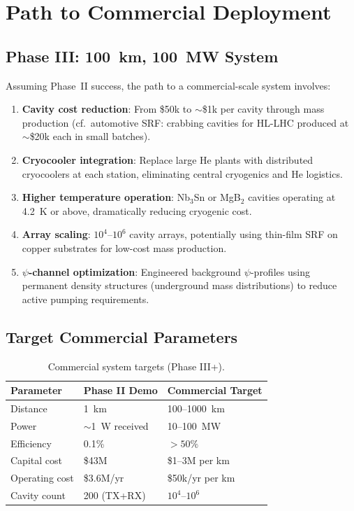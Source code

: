 \documentclass[11pt,letterpaper]{article}
\begin{document}
\section{Path to Commercial Deployment}

\subsection{Phase III: 100~km, 100~MW System}

Assuming Phase~II success, the path to a commercial-scale system involves:

\begin{enumerate}
\item \textbf{Cavity cost reduction}: From \$50k to $\sim$\$1k per
cavity through mass production (cf.\ automotive SRF: crabbing cavities
for HL-LHC produced at $\sim$\$20k each in small batches).

\item \textbf{Cryocooler integration}: Replace large He plants with
distributed cryocoolers at each station, eliminating central cryogenics
and He logistics.

\item \textbf{Higher temperature operation}: Nb$_3$Sn or MgB$_2$
cavities operating at 4.2~K or above, dramatically reducing cryogenic
cost.

\item \textbf{Array scaling}: $10^4$--$10^6$ cavity arrays, potentially
using thin-film SRF on copper substrates for low-cost mass production.

\item \textbf{$\psi$-channel optimization}: Engineered background
$\psi$-profiles using permanent density structures (underground mass
distributions) to reduce active pumping requirements.
\end{enumerate}

\subsection{Target Commercial Parameters}

\begin{table}[H]
\caption{Commercial system targets (Phase III+).}
\begin{tabular}{lll}
\toprule
Parameter & Phase II Demo & Commercial Target \\
\midrule
Distance & 1~km & 100--1000~km \\
Power & $\sim$1~W received & 10--100~MW \\
Efficiency & 0.1\% & $> 50\%$ \\
Capital cost & \$43M & \$1--3M per km \\
Operating cost & \$3.6M/yr & \$50k/yr per km \\
Cavity count & 200 (TX+RX) & $10^4$--$10^6$ \\
\bottomrule
\end{tabular}
\end{table}
\end{document}
